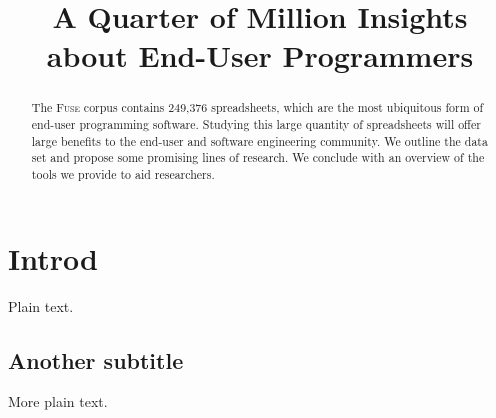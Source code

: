 \documentclass[conference]{IEEEtran}
\newcommand{\xlscount}{249,376}
\begin{document}
\title{A Quarter of Million Insights about End-User Programmers}

\author{
}


\maketitle

\begin{abstract}
The \textsc{Fuse} corpus contains \xlscount{} spreadsheets, which are the most ubiquitous form of end-user programming software. 
Studying this large quantity of spreadsheets will offer large benefits to the end-user and software engineering community.
We outline the data set and propose some promising lines of research.
We conclude with an overview of the tools we provide to aid researchers.

\end{abstract}


\IEEEpeerreviewmaketitle

\section{Introd}

Plain text.

\subsection{Another subtitle}

More plain text.
\end{document}
